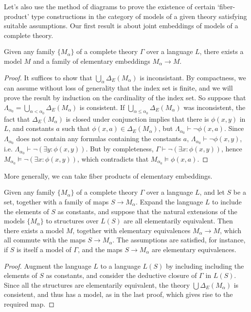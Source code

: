 Let's also use the method of diagrams to prove the existence of certain `fiber-product' type constructions in the category of models of a given theory satisfying suitable assumptions. Our first result is about joint embeddings of models of a complete theory.

\begin{theorem}
    Given any family $\{ M_\alpha \}$ of a complete theory $\Gamma$ over a language $L$, there exists a model $M$ and a family of elementary embeddings $M_\alpha \to M$.
\end{theorem}
\begin{proof}
    It suffices to show that $\bigcup_\alpha \Delta_E(M_\alpha)$ is inconsistant. By compactness, we can assume without loss of generality that the index set is finite, and we will prove the result by induction on the cardinality of the index set. So suppose that $\Lambda_{\alpha_0} = \bigcup_{\alpha < \alpha_0} \Delta_E(M_\alpha)$ is consistent. If $\bigcup_{\alpha \leq \alpha_0} \Delta_E(M_\alpha)$ was inconsistent, the fact that $\Delta_E(M_\alpha)$ is closed under conjunction implies that there is $\phi(x,y)$ in $L$, and constants $a$ such that $\phi(x,a) \in \Delta_E(M_\alpha)$, but $\Lambda_{\alpha_0} \vdash \neg \phi(x,a)$. Since $\Lambda_{\alpha_0}$ does not contain any formulas containing the constants $a$, $\Lambda_{\alpha_0} \vdash \neg \phi(x,y)$, i.e. $\Lambda_{\alpha_0} \vdash \neg (\exists y: \phi(x,y))$. But by completeness, $\Gamma \vdash \neg (\exists x: \phi(x,y))$, hence $M_{\alpha_0} \vDash \neg (\exists x: \phi(x,y))$, which contradicts that $M_{\alpha_0} \vDash \phi(x,a)$.
\end{proof}

More generally, we can take fiber products of elementary embeddings.

\begin{theorem}
    Given any family $\{ M_\alpha \}$ of a complete theory $\Gamma$ over a language $L$, and let $S$ be a set, together with a family of maps $S \to M_\alpha$. Expand the language $L$ to include the elements of $S$ as constants, and suppose that the natural extensions of the models $\{ M_\alpha \}$ to structures over $L(S)$ are all elementarily equivalent. Then there exists a model $M$, together with elementary equivalences $M_\alpha \to M$, which all commute with the maps $S \to M_\alpha$. The assumptions are satisfied, for instance, if $S$ is itself a model of $\Gamma$, and the maps $S \to M_\alpha$ are elementary equivalences.
\end{theorem}
\begin{proof}
    Augment the language $L$ to a language $L(S)$ by including including the elements of $S$ as constants, and consider the deductive closure of $\Gamma$ in $L(S)$. Since all the structures are elementarily equivalent, the theory $\bigcup \Delta_E(M_\alpha)$ is consistent, and thus has a model, as in the last proof, which gives rise to the required map.
\end{proof}


